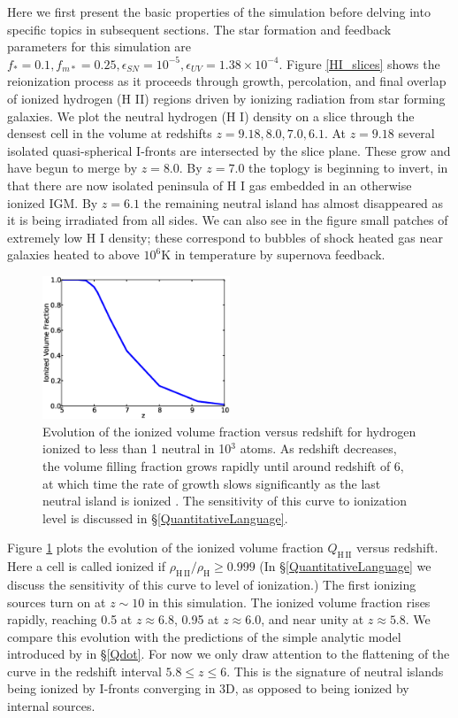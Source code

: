 Here we first present the basic properties of the simulation before delving into specific topics in subsequent sections. The star formation and feedback parameters for this simulation are $f_* =0.1, f_{m*}=0.25, \epsilon_{SN}=10^{-5}, \epsilon_{UV}=1.38 \times 10^{-4}$. Figure \ref{HI_slices} shows the reionization process as it proceeds through growth, percolation, and final overlap of ionized hydrogen (H {\footnotesize II}) regions driven by ionizing radiation from star forming galaxies. We plot the neutral hydrogen (H {\footnotesize I}) density on a slice through the densest cell in the volume at redshifts $z=9.18, 8.0, 7.0, 6.1$.  At $z=9.18$ several isolated quasi-spherical I-fronts are intersected by the slice plane.  These grow and have begun to merge by $z=8.0$. By $z=7.0$ the toplogy is beginning to invert, in that there are now isolated peninsula of H {\footnotesize I} gas embedded in an otherwise ionized IGM. By $z=6.1$ the remaining neutral island has almost disappeared as it is being irradiated from all sides. We can also see in the figure small patches of extremely low H {\footnotesize I} density; these correspond to bubbles of shock heated gas near galaxies heated to above $10^6$K in temperature by supernova feedback.

\begin{figure}
	\includegraphics[width=0.5\textwidth]{E3Ionized_vs_Redshift.eps}
	\caption{Evolution of the ionized volume fraction versus redshift for hydrogen ionized to less than 1 neutral in 10$^3$ atoms.  As redshift decreases, the volume filling fraction grows rapidly until around redshift of 6, at which time the rate of growth slows significantly as the last neutral island is ionized .  The sensitivity of this curve to ionization level is discussed in \S\ref{QuantitativeLanguage}.}
	\label{Ion1E3}
\end{figure}

Figure \ref{Ion1E3} plots the evolution of the ionized volume fraction $Q_\mathrm{H\,II}$ versus redshift. Here a cell is called ionized if $\rho_\mathrm{H\,II}/\rho_\mathrm{H} \geq 0.999$ (In \S\ref{QuantitativeLanguage} we discuss the sensitivity of this curve to level of ionization.) The first ionizing sources turn on at $z \sim 10$ in this simulation. The ionized volume fraction rises rapidly, reaching 0.5 at $z \approx 6.8$, 0.95 at $z \approx 6.0$, and near unity at $z \approx 5.8$. We compare this evolution with the predictions of the simple analytic model introduced by \cite{MadauEtAl1999} in \S\ref{Qdot}. For now we only draw attention to the flattening of the curve in the redshift interval $5.8 \leq z \leq 6$. This is the signature of neutral islands being ionized by I-fronts converging in 3D, as opposed to being ionized by internal sources. 

